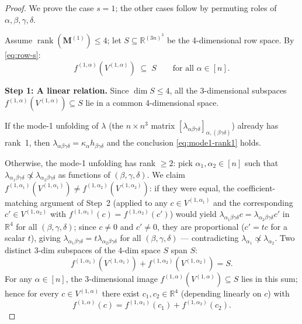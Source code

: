 \documentclass[12pt]{article}
\theoremstyle{definition}
\DeclareMathOperator{\rank}{rank}
\newcommand{\bR}{\mathbb{R}}
\begin{document}
\begin{proof}
We prove the case $s=1$; the other cases follow by permuting roles of $\alpha,\beta,\gamma,\delta$.

Assume $\rank(\mathbf{M}^{(1)})\leq 4$; let $S\subseteq\bR^{(3n)^3}$ be the 4-dimensional row
space.  By \eqref{eq:row-s}:
\begin{equation}\label{eq:f-in-S}
  f^{(1,\alpha)}(V^{(1,\alpha)}) \;\subseteq\; S
  \qquad\text{for all }\alpha\in[n].
\end{equation}

\noindent\textbf{Step 1: A linear relation.}
Since $\dim S\leq4$, all the 3-dimensional subspaces $f^{(1,\alpha)}(V^{(1,\alpha)})\subseteq S$
lie in a common 4-dimensional space.

If the mode-1 unfolding of $\lambda$ (the $n\times n^3$ matrix $[\lambda_{\alpha\beta\gamma\delta}]_{\alpha,(\beta\gamma\delta)}$) already has rank~1, then $\lambda_{\alpha\beta\gamma\delta}=\kappa_\alpha h_{\beta\gamma\delta}$ and the conclusion \eqref{eq:mode1-rank1} holds.

Otherwise, the mode-1 unfolding has rank $\geq2$: pick $\alpha_1,\alpha_2\in[n]$ such that
$\lambda_{\alpha_1\beta\gamma\delta}\not\propto\lambda_{\alpha_2\beta\gamma\delta}$ as functions
of $(\beta,\gamma,\delta)$.  We claim $f^{(1,\alpha_1)}(V^{(1,\alpha_1)})\neq f^{(1,\alpha_2)}(V^{(1,\alpha_2)})$:
if they were equal, the coefficient-matching argument of Step~2 (applied to any
$c\in V^{(1,\alpha_1)}$ and the corresponding $c'\in V^{(1,\alpha_2)}$ with
$f^{(1,\alpha_1)}(c)=f^{(1,\alpha_2)}(c')$) would yield $\lambda_{\alpha_1\beta\gamma\delta}c
=\lambda_{\alpha_2\beta\gamma\delta}c'$ in $\bR^4$ for all $(\beta,\gamma,\delta)$;
since $c\neq0$ and $c'\neq0$, they are proportional ($c'=tc$ for a scalar $t$), giving
$\lambda_{\alpha_1\beta\gamma\delta}=t\lambda_{\alpha_2\beta\gamma\delta}$ for all
$(\beta,\gamma,\delta)$ — contradicting $\lambda_{\alpha_1}\not\propto\lambda_{\alpha_2}$.
Two distinct 3-dim subspaces of the 4-dim space $S$ span $S$:
\[
  f^{(1,\alpha_1)}(V^{(1,\alpha_1)}) + f^{(1,\alpha_2)}(V^{(1,\alpha_2)}) = S.
\]
For any $\alpha\in[n]$, the 3-dimensional image $f^{(1,\alpha)}(V^{(1,\alpha)})\subseteq S$
lies in this sum; hence for every $c\in V^{(1,\alpha)}$ there exist
$c_1,c_2\in\bR^4$ (depending linearly on $c$) with
\begin{equation}\label{eq:decomp1}
  f^{(1,\alpha)}(c) = f^{(1,\alpha_1)}(c_1) + f^{(1,\alpha_2)}(c_2).
\end{equation}


\end{proof}
\end{document}
